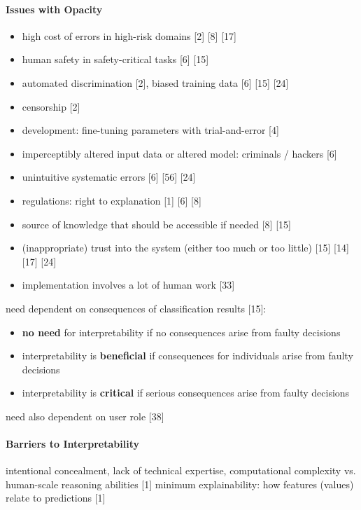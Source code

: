 \paragraph{Issues with Opacity}
\begin{itemize}
	\item high cost of errors in high-risk domains [2] [8] [17]
	\item human safety in safety-critical tasks [6] [15]
	\item automated discrimination [2], biased training data [6] [15] [24]
	\item censorship [2]
	\item development: fine-tuning parameters with trial-and-error [4]
	\item imperceptibly altered input data or altered model: criminals / hackers [6]
	\item unintuitive systematic errors [6] [56] [24]
	\item regulations: right to explanation [1] [6] [8]
	\item source of knowledge that should be accessible if needed [8] [15]
	\item (inappropriate) trust into the system (either too much or too little) [15] [14] [17] [24]
	\item implementation involves a lot of human work [33]
\end{itemize}
need dependent on consequences of classification results [15]:
\begin{itemize}
	\item \textbf{no need} for interpretability if no consequences arise from faulty decisions
	\item interpretability is \textbf{beneficial} if consequences for individuals arise from faulty decisions
	\item interpretability is \textbf{critical} if serious consequences arise from faulty decisions
\end{itemize}
need also dependent on user role [38] \newline

\paragraph{Barriers to Interpretability}
intentional concealment, lack of technical expertise, computational complexity vs. human-scale reasoning abilities [1] \newline
minimum explainability: how features (values) relate to predictions [1] \newline

